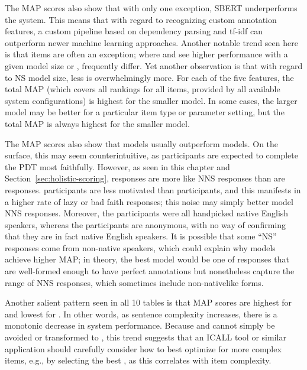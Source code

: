 The MAP scores also show that with only one exception, SBERT underperforms the system. 
This means that with regard to recognizing custom annotation features, a custom pipeline based on dependency parsing and tf-idf can outperform newer machine learning approaches.  Another notable trend seen here is that  items are often an exception; where  and  see higher performance with a given model size or ,  frequently differ. Yet another observation is that with regard to NS model size, less is overwhelmingly more. For each of the five features, the total MAP (which covers all rankings for all items, provided by all available system configurations) is highest for the smaller model. In some cases, the larger model may be better for a particular item type or parameter setting, but the total MAP is always highest for the smaller model.

The MAP scores also show that  models usually outperform  models. On the surface, this may seem counterintuitive, as  participants are expected to complete the PDT most faithfully. However, as seen in this chapter and Section~\ref{sec:holistic-scoring},  responses are more like NNS responses than are  responses.  participants are less motivated than  participants, and this manifests in a higher rate of lazy or bad faith responses; this noise may simply better model NNS responses. Moreover, the  participants were all handpicked native English speakers, whereas the  participants are anonymous, with no way of confirming that they are in fact native English speakers. It is possible that some ``NS'' responses come from non-native speakers, which could explain why  models achieve higher MAP; in theory, the best model would be one of responses that are well-formed enough to have perfect annotations but nonetheless capture the range of NNS responses, which sometimes include non-nativelike forms.

Another salient pattern seen in all 10 tables is that MAP scores are highest for  and lowest for . In other words, as sentence complexity increases, there is a monotonic decrease in system performance. Because  and  cannot simply be avoided or transformed to , this trend suggests that an ICALL tool or similar application should carefully consider how to best optimize for more complex items, e.g., by selecting the best , as this correlates with item complexity.

